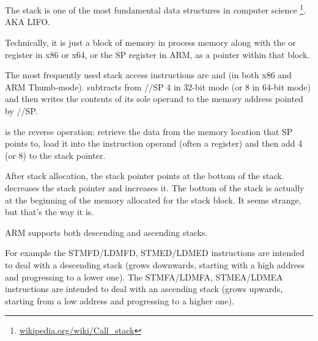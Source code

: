 \section{\Stack}
\label{sec:stack}
\myindex{\Stack}

The stack is one of the most fundamental data structures in computer science
\footnote{\href{http://go.yurichev.com/17119}{wikipedia.org/wiki/Call\_stack}}.
\ac{AKA} \ac{LIFO}.

Technically, it is just a block of memory in process memory along with the \ESP or \RSP register in x86 or x64, or the \ac{SP} register in ARM, as a pointer within that block.

The most frequently used stack access instructions are \PUSH and \POP (in both x86 and ARM Thumb-mode). 
\PUSH subtracts from \ESP/\RSP/\ac{SP} 4 in 32-bit mode (or 8 in 64-bit mode) and then writes the contents of its sole operand to the memory address pointed by \ESP/\RSP/\ac{SP}.

\POP is the reverse operation: retrieve the data from the memory location that \ac{SP} points to, 
load it into the instruction operand (often a register) and then add 4 (or 8) to the \gls{stack pointer}.

After stack allocation, the \gls{stack pointer} points at the bottom of the stack.
\PUSH decreases the \gls{stack pointer} and \POP increases it.
The bottom of the stack is actually at the beginning of the memory allocated for the stack block. It seems strange, but that's the way it is.

ARM supports both descending and ascending stacks.


For example the \ac{STMFD}/\ac{LDMFD}, \ac{STMED}/\ac{LDMED} instructions are intended to deal with a descending stack (grows downwards, starting with a high address and progressing to a lower one).
The \ac{STMFA}/\ac{LDMFA}, \ac{STMEA}/\ac{LDMEA} instructions are intended to deal with an ascending stack (grows upwards, starting from a low address and progressing to a higher one).


